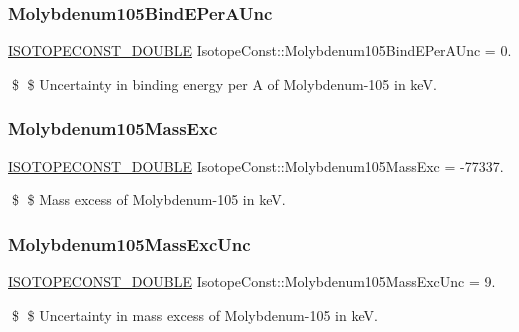 \subsubsection{\texorpdfstring{Molybdenum105\+Bind\+E\+Per\+A\+Unc}{Molybdenum105BindEPerAUnc}}
{\footnotesize\ttfamily \mbox{\hyperlink{group___isotope_const-_macros_ga8f45a7272ce02c0b4c65c44636ed719a}{I\+S\+O\+T\+O\+P\+E\+C\+O\+N\+S\+T\+\_\+\+D\+O\+U\+B\+LE}} Isotope\+Const\+::\+Molybdenum105\+Bind\+E\+Per\+A\+Unc = 0.}

\$ \$ Uncertainty in binding energy per A of Molybdenum-\/105 in keV. \mbox{\label{group___isotope_const-_molybdenum-_mo105_gad3b467cfc52f7b343b37881da8b0702d}} 
\subsubsection{\texorpdfstring{Molybdenum105\+Mass\+Exc}{Molybdenum105MassExc}}
{\footnotesize\ttfamily \mbox{\hyperlink{group___isotope_const-_macros_ga8f45a7272ce02c0b4c65c44636ed719a}{I\+S\+O\+T\+O\+P\+E\+C\+O\+N\+S\+T\+\_\+\+D\+O\+U\+B\+LE}} Isotope\+Const\+::\+Molybdenum105\+Mass\+Exc = -\/77337.}

\$ \$ Mass excess of Molybdenum-\/105 in keV. \mbox{\label{group___isotope_const-_molybdenum-_mo105_ga4b57e9947f1d64a21058060e2c7800e8}} 
\subsubsection{\texorpdfstring{Molybdenum105\+Mass\+Exc\+Unc}{Molybdenum105MassExcUnc}}
{\footnotesize\ttfamily \mbox{\hyperlink{group___isotope_const-_macros_ga8f45a7272ce02c0b4c65c44636ed719a}{I\+S\+O\+T\+O\+P\+E\+C\+O\+N\+S\+T\+\_\+\+D\+O\+U\+B\+LE}} Isotope\+Const\+::\+Molybdenum105\+Mass\+Exc\+Unc = 9.}

\$ \$ Uncertainty in mass excess of Molybdenum-\/105 in keV. \mbox{\label{group___isotope_const-_molybdenum-_mo105_ga3ea2c4b0deecf579116e89594a15c6d9}} 
